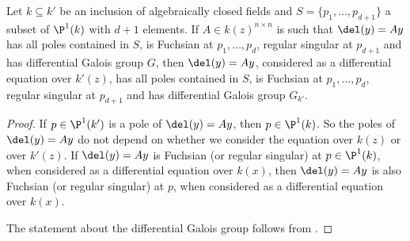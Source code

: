 \documentclass[a4paper, 11pt]{article}
\begin{document}
\begin{lemma}\label{lem:basechange}
	Let $k \subseteq k'$ be an inclusion of algebraically closed fields and $S=\{p_1,\ldots,p_{d+1}\}$ a subset of $\P^1(k)$ with $d+1$ elements. If $A\in k(z)^{n\times n}$ is such that $\del(y)=Ay$ has all poles contained in $S$, 	
	is Fuchsian at $p_1,\ldots,p_d$, regular singular at $p_{d+1}$ and has differential Galois group $G$,
	then $\del(y)=Ay$, considered as a differential equation over $k'(z)$, has all poles contained in $S$, 	
	is Fuchsian at $p_1,\ldots,p_d$, regular singular at $p_{d+1}$ and has differential Galois group $G_{k'}$.
\end{lemma}
\begin{proof}
If $p\in\P^1(k')$ is a pole of $\del(y)=Ay$, then $p\in\P^1(k)$. So the poles of $\del(y)=Ay$ do not depend on whether we consider the equation over $k(z)$ or over $k'(z)$. If $\del(y)=Ay$ is Fuchsian (or regular singular) at $p\in \P^1(k)$, when considered as a differential equation over $k(x)$, then $\del(y)=Ay$ is also Fuchsian (or regular singular) at $p$, when considered as a differential equation over $k(x)$.

The statement about the differential Galois group follows from \cite[Lemma 3.2]{fengwib}.
\end{proof}	
\end{document}
